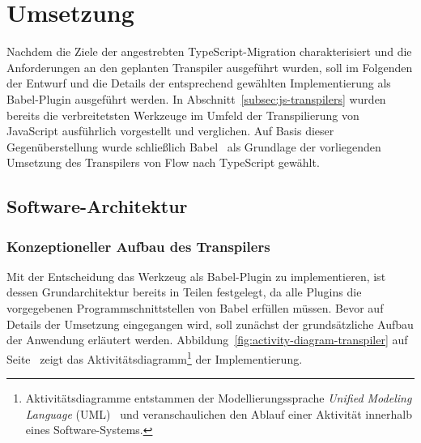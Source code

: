 \chapter{Umsetzung}
\label{chap:implementation}

Nachdem die Ziele der angestrebten TypeScript-Migration charakterisiert und die Anforderungen an den geplanten Transpiler ausgeführt wurden, soll im Folgenden der Entwurf und die Details der entsprechend gewählten Implementierung als Babel-Plugin ausgeführt werden. In Abschnitt~\ref{subsec:js-transpilers} wurden bereits die verbreitetsten Werkzeuge im Umfeld der Transpilierung von JavaScript ausführlich vorgestellt und verglichen. Auf Basis dieser Gegenüberstellung wurde schließlich Babel~\autocite{BABEL} als Grundlage der vorliegenden Umsetzung des Transpilers von Flow nach TypeScript gewählt.

\section{Software-Architektur}

\subsection{Konzeptioneller Aufbau des Transpilers}

Mit der Entscheidung das Werkzeug als Babel-Plugin zu implementieren, ist dessen Grundarchitektur bereits in Teilen festgelegt, da alle Plugins die vorgegebenen Programmschnittstellen von Babel erfüllen müssen. Bevor auf Details der Umsetzung eingegangen wird, soll zunächst der grundsätzliche Aufbau der Anwendung erläutert werden. Abbildung~\ref{fig:activity-diagram-transpiler} auf Seite~\pageref{fig:activity-diagram-transpiler} zeigt das Aktivitätsdiagramm\footnote{Aktivitätsdiagramme entstammen der Modellierungssprache \textit{Unified Modeling Language} (UML)~\autocite{OMG:UML} und veranschaulichen den Ablauf einer Aktivität innerhalb eines Software-Systems.} der Implementierung.

